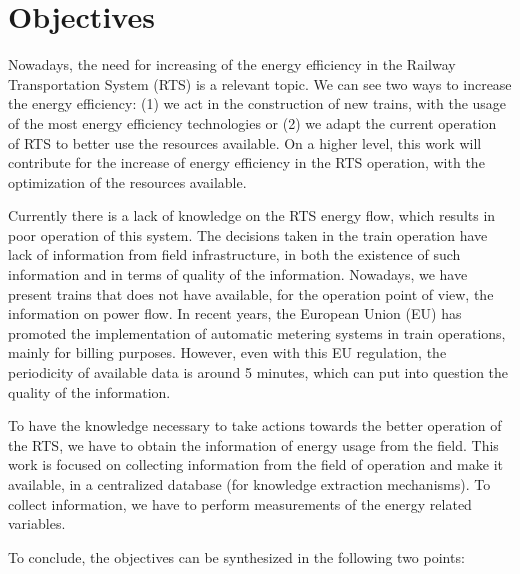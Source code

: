 

\section{Objectives}

Nowadays, the need for increasing of the energy efficiency in the Railway Transportation System (RTS) is a relevant topic.
We can see two ways to increase the energy efficiency: (1) we act in the construction of new trains, with the usage of the most energy efficiency technologies or (2) we adapt the current operation of RTS to better use the resources available.
On a higher level, this work will contribute for the increase of energy efficiency in the RTS operation, with the optimization of the resources available.

Currently there is a lack of knowledge on the RTS energy flow, which results in poor operation of this system. The decisions taken in the train operation have lack of information from field infrastructure, in both the existence of such information and in terms of quality of the information. Nowadays, we have present trains that does not have available, for the operation point of view, the information on power flow. In recent years, the European Union (EU) has promoted the implementation of automatic metering systems in train operations, mainly for billing purposes. However, even with this EU regulation, the periodicity of available data is around 5 minutes, which can put into question the quality of the information.

To have the knowledge necessary to take actions towards the better operation of the RTS, we have to obtain the information of energy usage from the field.
This work is focused on collecting information from the field of operation and make it available, in a centralized database (for knowledge extraction mechanisms). 
To collect information, we have to perform measurements of the energy related variables.

To conclude, the objectives can be synthesized in the following two points:

